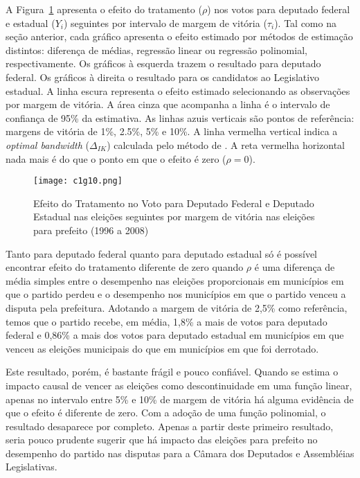 A Figura~\ref{fig:c1g10} apresenta o efeito do tratamento ($\rho$) nos votos para deputado federal e estadual ($Y_{i}$) seguintes por intervalo de margem de vitória ($\tau_{i}$). Tal como na seção anterior, cada gráfico apresenta o efeito estimado por métodos de estimação distintos: diferença de médias, regressão linear ou regressão polinomial, respectivamente. Os gráficos à esquerda trazem o resultado para deputado federal. Os gráficos à direita o resultado para os candidatos ao Legislativo estadual. A linha escura representa o efeito estimado selecionando as observações por margem de vitória. A área cinza que acompanha a linha é o intervalo de confiança de 95\% da estimativa. As linhas azuis verticais são pontos de referência: margens de vitória de 1\%, 2.5\%, 5\% e 10\%. A linha vermelha vertical indica a \textit{optimal bandwidth} ($\Delta_{IK}$) calculada pelo método de \citet{Imbens2011}. A reta vermelha horizontal nada mais é do que o ponto em que o efeito é zero ($\rho=0$).

\begin{figure}[htp]
	\centering
	\texttt{[image: c1g10.png]}
	\caption{Efeito do Tratamento no Voto para Deputado Federal e Deputado Estadual nas eleições seguintes por margem de vitória nas eleições para prefeito (1996 a 2008)}
	\label{fig:c1g10} 
\end{figure}

Tanto para deputado federal quanto para deputado estadual só é possível encontrar efeito do tratamento diferente de zero quando $\rho$ é uma diferença de média simples entre o desempenho nas eleições proporcionais em municípios em que o partido perdeu e o desempenho nos municípios em que o partido venceu a disputa pela prefeitura. Adotando a margem de vitória de 2,5\% como referência, temos que o partido recebe, em média, 1,8\% a mais de votos para deputado federal e 0,86\% a mais dos votos para deputado estadual em municípios em que venceu as eleições municipais do que em municípios em que foi derrotado.

Este resultado, porém, é bastante frágil e pouco confiável. Quando se estima o impacto causal de vencer as eleições como descontinuidade em uma função linear, apenas no intervalo entre 5\% e 10\% de margem de vitória há alguma evidência de que o efeito é diferente de zero. Com a adoção de uma função polinomial, o resultado desaparece por completo. Apenas a partir deste primeiro resultado, seria pouco prudente sugerir que há impacto das eleições para prefeito no desempenho do partido nas disputas para a Câmara dos Deputados e Assembléias Legislativas.

